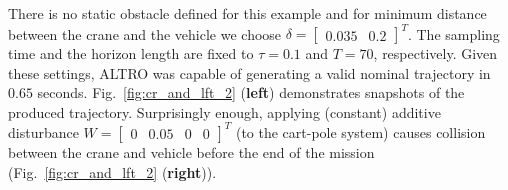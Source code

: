 There is no static obstacle defined for this example and for minimum distance between the crane and the vehicle we choose $\delta=\begin{bmatrix}0.035&0.2\end{bmatrix}^T$. The sampling time and the horizon length are fixed to $\tau=0.1$ and $T=70$, respectively. Given these settings, ALTRO was capable of generating a valid nominal trajectory in $0.65$ seconds. Fig.~\ref{fig:cr_and_lft_2} (\textbf{left}) demonstrates snapshots of the produced trajectory. Surprisingly enough, applying (constant) additive disturbance $W=\begin{bmatrix}0&0.05&0&0\end{bmatrix}^T$ (to the cart-pole system) causes collision between the crane and vehicle before the end of the mission (Fig.~\ref{fig:cr_and_lft_2} (\textbf{right})).

